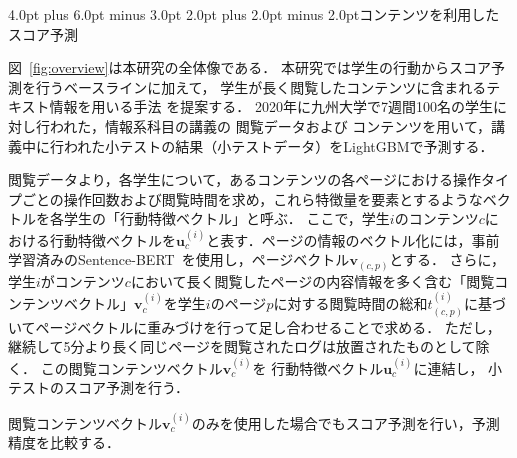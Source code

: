 \documentclass[a4paper,twocolumn,11pt]{jarticle}
\makeatletter
\renewcommand{\section}{\@startsection {section}{1}{\z@}%
{4.0pt plus 6.0pt minus 3.0pt}%
{2.0pt plus 2.0pt minus 2.0pt}{\large\bf }}
\renewcommand{\subsection}{\@startsection{subsection}{2}{\z@}%
{4.0pt plus 4.0pt minus 3.0pt}%
{1.0pt plus 2.0pt minus 1.0pt}{\large\bf }}
\makeatother
\begin{document}
\section{コンテンツを利用したスコア予測}\label{sec:scoreprediction}

図~\ref{fig:overview}は本研究の全体像である．
本研究では学生の行動からスコア予測を行うベースラインに加えて，
学生が長く閲覧したコンテンツに含まれるテキスト情報を用いる手法
を提案する．
2020年に九州大学で7週間100名の学生に対し行われた，情報系科目の講義の
閲覧データおよび
コンテンツを用いて，講義中に行われた小テストの結果（小テストデータ）をLightGBMで予測する．

閲覧データより，各学生について，あるコンテンツの各ページにおける操作タイプごとの操作回数および閲覧時間を求め，これら特徴量を要素とするようなベクトルを各学生の「行動特徴ベクトル」と呼ぶ．
ここで，学生$i$のコンテンツ$c$における行動特徴ベクトルを$\bm{u}^{(i)}_c$と表す．ページの情報のベクトル化には，事前学習済みのSentence-BERT~\cite{sonoisa}を使用し，ページベクトル$\bm{v}_{(c,p)}$とする．
さらに，学生$i$がコンテンツ$c$において長く閲覧したページの内容情報を多く含む「閲覧コンテンツベクトル」$\bm{v}^{(i)}_c$を学生$i$のページ$p$に対する閲覧時間の総和$t^{(i)}_{(c,p)}$に基づいてページベクトルに重みづけを行って足し合わせることで求める．
ただし，継続して5分より長く同じページを閲覧されたログは放置されたものとして除く．
この閲覧コンテンツベクトル$\bm{v}^{(i)}_c$を
行動特徴ベクトル$\bm{u}^{(i)}_c$に連結し，
小テストのスコア予測を行う．

閲覧コンテンツベクトル$\bm{v}^{(i)}_c$のみを使用した場合でもスコア予測を行い，予測精度を比較する．
\end{document}
